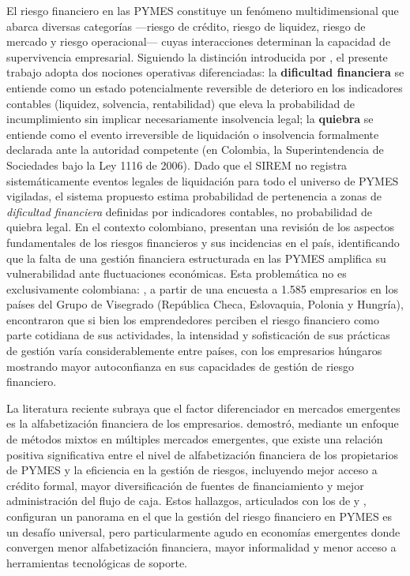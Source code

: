 \documentclass[12pt, letterpaper]{article}
\begin{document}
El riesgo financiero en las PYMES constituye un fen\'omeno multidimensional que abarca diversas categor\'ias ---riesgo de cr\'edito, riesgo de liquidez, riesgo de mercado y riesgo operacional--- cuyas interacciones determinan la capacidad de supervivencia empresarial. Siguiendo la distinci\'on introducida por \citet{Bortolotti2024}, el presente trabajo adopta dos nociones operativas diferenciadas: la \textbf{dificultad financiera} se entiende como un estado potencialmente reversible de deterioro en los indicadores contables (liquidez, solvencia, rentabilidad) que eleva la probabilidad de incumplimiento sin implicar necesariamente insolvencia legal; la \textbf{quiebra} se entiende como el evento irreversible de liquidaci\'on o insolvencia formalmente declarada ante la autoridad competente (en Colombia, la Superintendencia de Sociedades bajo la Ley 1116 de 2006). Dado que el SIREM no registra sistem\'aticamente eventos legales de liquidaci\'on para todo el universo de PYMES vigiladas, el sistema propuesto estima probabilidad de pertenencia a zonas de \textit{dificultad financiera} definidas por indicadores contables, no probabilidad de quiebra legal. En el contexto colombiano, \citet{HigueraVargas2021} presentan una revisi\'on de los aspectos fundamentales de los riesgos financieros y sus incidencias en el pa\'is, identificando que la falta de una gesti\'on financiera estructurada en las PYMES amplifica su vulnerabilidad ante fluctuaciones econ\'omicas. Esta problem\'atica no es exclusivamente colombiana: \citet{Kotaskova2020}, a partir de una encuesta a 1.585 empresarios en los pa\'ises del Grupo de Visegrado (Rep\'ublica Checa, Eslovaquia, Polonia y Hungr\'ia), encontraron que si bien los emprendedores perciben el riesgo financiero como parte cotidiana de sus actividades, la intensidad y sofisticaci\'on de sus pr\'acticas de gesti\'on var\'ia considerablemente entre pa\'ises, con los empresarios h\'ungaros mostrando mayor autoconfianza en sus capacidades de gesti\'on de riesgo financiero.

La literatura reciente subraya que el factor diferenciador en mercados emergentes es la alfabetizaci\'on financiera de los empresarios. \citet{Senaya2025} demostr\'o, mediante un enfoque de m\'etodos mixtos en m\'ultiples mercados emergentes, que existe una relaci\'on positiva significativa entre el nivel de alfabetizaci\'on financiera de los propietarios de PYMES y la eficiencia en la gesti\'on de riesgos, incluyendo mejor acceso a cr\'edito formal, mayor diversificaci\'on de fuentes de financiamiento y mejor administraci\'on del flujo de caja. Estos hallazgos, articulados con los de \citet{Kotaskova2020} y \citet{HigueraVargas2021}, configuran un panorama en el que la gesti\'on del riesgo financiero en PYMES es un desaf\'io universal, pero particularmente agudo en econom\'ias emergentes donde convergen menor alfabetizaci\'on financiera, mayor informalidad y menor acceso a herramientas tecnol\'ogicas de soporte.
\end{document}
